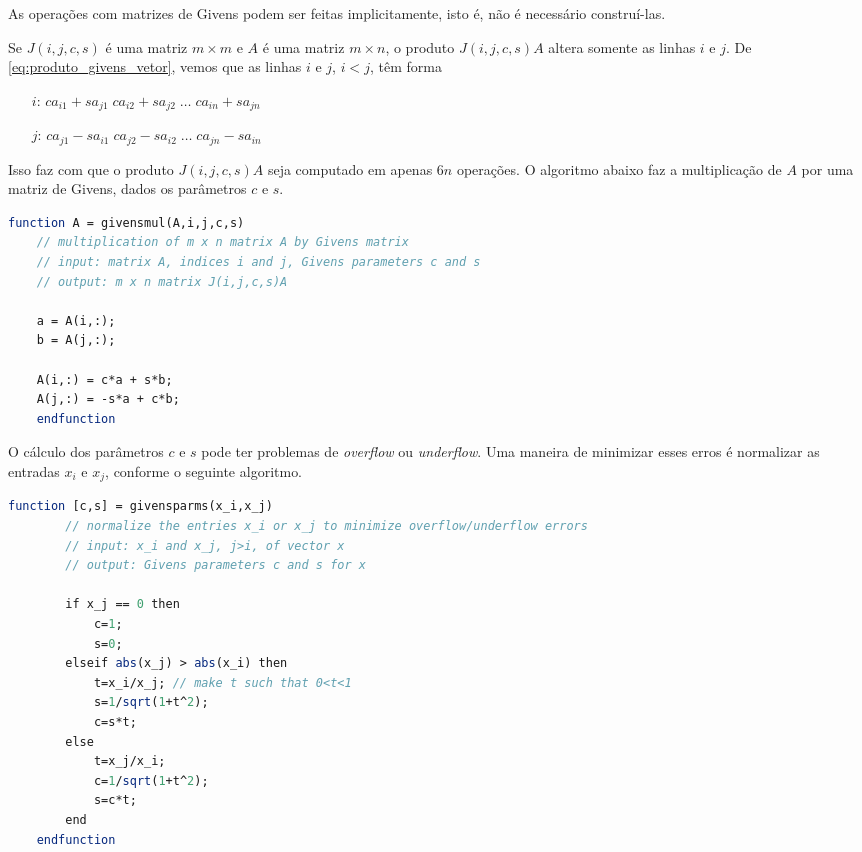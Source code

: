 \documentclass{article}
\begin{document}
\begin{rem}
    As operações com matrizes de Givens podem ser feitas implicitamente, isto é, não é necessário construí-las.
\end{rem}

Se \(J(i,j,c,s)\) é uma matriz \(m \times m\) e \(A\) é uma matriz \(m \times n\), o produto \(J(i,j,c,s)A\) altera somente as linhas \(i\) e \(j\). De \eqref{eq:produto_givens_vetor}, vemos que as linhas \(i\) e \(j\), \(i<j\), têm forma 

\begin{itemize}
    \item [\(i\):] \(ca_{i1} + sa_{j1}\; ca_{i2} + sa_{j2}\; \ldots\; ca_{in} + sa_{jn}\)
    \item [\(j\):] \(ca_{j1} - sa_{i1}\; ca_{j2} - sa_{i2}\; \ldots\; ca_{jn} - sa_{in}\)
\end{itemize}
Isso faz com que o produto \(J(i,j,c,s)A\) seja computado em apenas \(6n\) operações. O algoritmo abaixo faz a multiplicação de \(A\) por uma matriz de Givens, dados os parâmetros \(c\) e \(s\).

\begin{lstlisting}[language=Scilab, caption=Multiplicação de uma matriz por uma matriz de Givens]
    function A = givensmul(A,i,j,c,s)
    // multiplication of m x n matrix A by Givens matrix
    // input: matrix A, indices i and j, Givens parameters c and s
    // output: m x n matrix J(i,j,c,s)A
    
    a = A(i,:);
    b = A(j,:);
    
    A(i,:) = c*a + s*b;
    A(j,:) = -s*a + c*b;
    endfunction
\end{lstlisting}

O cálculo dos parâmetros \(c\) e \(s\) pode ter problemas de \emph{overflow} ou \emph{underflow}. Uma maneira de minimizar esses erros é normalizar as entradas \(x_i\) e \(x_j\), conforme o seguinte algoritmo.

\begin{lstlisting}[language=Scilab, caption=Cálculo dos parâmetros de Givens]
    function [c,s] = givensparms(x_i,x_j)
        // normalize the entries x_i or x_j to minimize overflow/underflow errors
        // input: x_i and x_j, j>i, of vector x
        // output: Givens parameters c and s for x
        
        if x_j == 0 then
            c=1;
            s=0;
        elseif abs(x_j) > abs(x_i) then
            t=x_i/x_j; // make t such that 0<t<1
            s=1/sqrt(1+t^2);
            c=s*t;
        else
            t=x_j/x_i;
            c=1/sqrt(1+t^2);
            s=c*t;
        end
    endfunction
\end{lstlisting}
\end{document}
